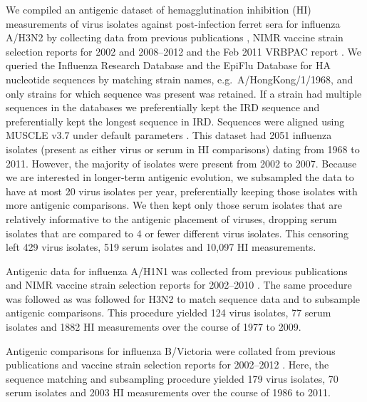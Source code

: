 \documentclass[11pt,oneside,letterpaper]{article}
\begin{document}
We compiled an antigenic dataset of hemagglutination inhibition (HI) measurements of virus isolates against post-infection ferret sera for influenza A/H3N2 by collecting data from previous publications \cite{Hay01,Smith04,Russell08,Barr10}, NIMR vaccine strain selection reports for 2002 and 2008--2012 \cite{NIMR02,NIMRMarch08,NIMRFeb09,NIMRFeb10,NIMRSep10,NIMRSep11,NIMRFeb12} and the Feb 2011 VRBPAC report \cite{Cox11FDA}.
We queried the Influenza Research Database \cite{IRD} and the EpiFlu Database \cite{GISAID} for HA nucleotide sequences by matching strain names, e.g.\ A/HongKong/1/1968, and only strains for which sequence was present was retained.
If a strain had multiple sequences in the databases we preferentially kept the IRD sequence and preferentially kept the longest sequence in IRD. 
Sequences were aligned using MUSCLE v3.7 under default parameters \cite{MUSCLE}.
This dataset had 2051 influenza isolates (present as either virus or serum in HI comparisons) dating from 1968 to 2011. 
However, the majority of isolates were present from 2002 to 2007. 
Because we are interested in longer-term antigenic evolution, we subsampled the data to have at most 20 virus isolates per year, preferentially keeping those isolates with more antigenic comparisons. 
We then kept only those serum isolates that are relatively informative to the antigenic placement of viruses, dropping serum isolates that are compared to 4 or fewer different virus isolates.
This censoring left 429 virus isolates, 519 serum isolates and 10,097 HI measurements. 

Antigenic data for influenza A/H1N1 was collected from previous publications \cite{Kendal78,Webster79,Nakajima79,Nakajima81,Chakraverty82,Pereira82,Chakraverty86,Cox83,Daniels85,Raymond86,Stevens87,Donatelli93,Hay01,Daum02,McDonald07,Barr10} and NIMR vaccine strain selection reports for 2002--2010 \cite{NIMR02,NIMR03,NIMR04,NIMRFeb05,NIMRSep05,NIMRMarch06,NIMRSep06,NIMRMarch07,NIMRSep07,NIMRMarch08,NIMRSep08,NIMRFeb09,NIMRFeb10}.
The same procedure was followed as was followed for H3N2 to match sequence data and to subsample antigenic comparisons.
This procedure yielded 124 virus isolates, 77 serum isolates and 1882 HI measurements over the course of 1977 to 2009.

Antigenic comparisons for influenza B/Victoria were collated from previous publications \cite{Rota90, Hay01, Muyanga01, Shaw02, Ansaldi04, Puzelli04, Xu04, Barr06, Daum06, Lin07} and vaccine strain selection reports for 2002--2012 \cite{AusWHO06, NIMR02, NIMR03, NIMR04, NIMRFeb05, NIMRSep05, NIMRMarch06, NIMRSep06, NIMRMarch07, NIMRSep07, NIMRMarch08, NIMRFeb09, NIMRSep09, NIMRFeb10, NIMRSep10, NIMRFeb11, NIMRSep11, NIMRFeb12}.
Here, the sequence matching and subsampling procedure yielded 179 virus isolates, 70 serum isolates and 2003 HI measurements over the course of 1986 to 2011.
\end{document}
